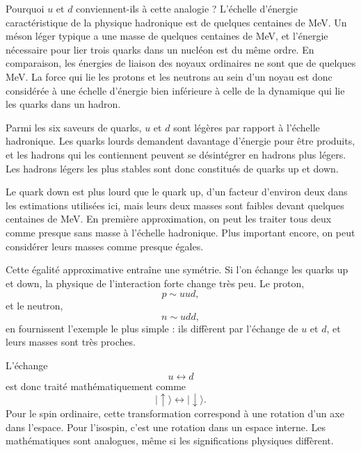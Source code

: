 
Pourquoi \(u\) et \(d\) conviennent-ils à cette analogie ? L’échelle d’énergie caractéristique de la physique hadronique est de quelques centaines de MeV. Un méson léger typique a une masse de quelques centaines de MeV, et l’énergie nécessaire pour lier trois quarks dans un nucléon est du même ordre. En comparaison, les énergies de liaison des noyaux ordinaires ne sont que de quelques MeV. La force qui lie les protons et les neutrons au sein d’un noyau est donc considérée à une échelle d’énergie bien inférieure à celle de la dynamique qui lie les quarks dans un hadron.

Parmi les six saveurs de quarks, \(u\) et \(d\) sont légères par rapport à l’échelle hadronique. Les quarks lourds demandent davantage d’énergie pour être produits, et les hadrons qui les contiennent peuvent se désintégrer en hadrons plus légers. Les hadrons légers les plus stables sont donc constitués de quarks up et down.

Le quark down est plus lourd que le quark up, d’un facteur d’environ deux dans les estimations utilisées ici, mais leurs deux masses sont faibles devant quelques centaines de MeV. En première approximation, on peut les traiter tous deux comme presque sans masse à l’échelle hadronique. Plus important encore, on peut considérer leurs masses comme presque égales.

Cette égalité approximative entraîne une symétrie. Si l’on échange les quarks up et down, la physique de l’interaction forte change très peu. Le proton,
\begin{equation}
p\sim uud,
\end{equation}
et le neutron,
\begin{equation}
n\sim udd,
\end{equation}
en fournissent l’exemple le plus simple : ils diffèrent par l’échange de \(u\) et \(d\), et leurs masses sont très proches.

L’échange
\begin{equation}
u\longleftrightarrow d
\end{equation}
est donc traité mathématiquement comme
\begin{equation}
|\uparrow\rangle\longleftrightarrow|\downarrow\rangle.
\end{equation}
Pour le spin ordinaire, cette transformation correspond à une rotation d’un axe dans l’espace. Pour l’isospin, c’est une rotation dans un espace interne. Les mathématiques sont analogues, même si les significations physiques diffèrent.

